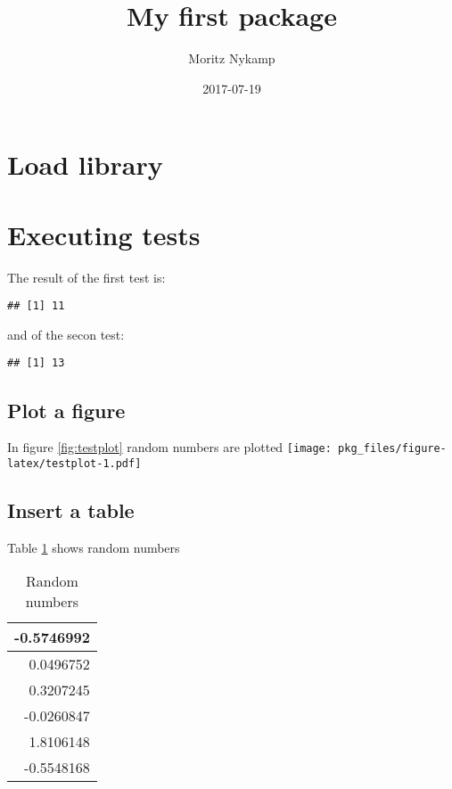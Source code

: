 \documentclass[]{article}
\title{My first package}
\author{Moritz Nykamp}
\date{2017-07-19}
\begin{document}
\maketitle

{
\setcounter{tocdepth}{2}
\tableofcontents
}
\section{Load library}\label{load-library}

\section{Executing tests}\label{executing-tests}

The result of the first test is:

\begin{verbatim}
## [1] 11
\end{verbatim}

and of the secon test:

\begin{verbatim}
## [1] 13
\end{verbatim}

\subsection{Plot a figure}\label{plot-a-figure}

In figure \ref{fig:testplot} random numbers are plotted
\texttt{[image: pkg\_files/figure-latex/testplot-1.pdf]}

\subsection{Insert a table}\label{insert-a-table}

Table \ref{tab:testtab} shows random numbers

\begin{table}

\caption{\label{tab:testtab}Random numbers}
\centering
\begin{tabular}[t]{r}
\hline
-0.5746992\\
\hline
0.0496752\\
\hline
0.3207245\\
\hline
-0.0260847\\
\hline
1.8106148\\
\hline
-0.5548168\\
\hline
\end{tabular}
\end{table}
\end{document}
